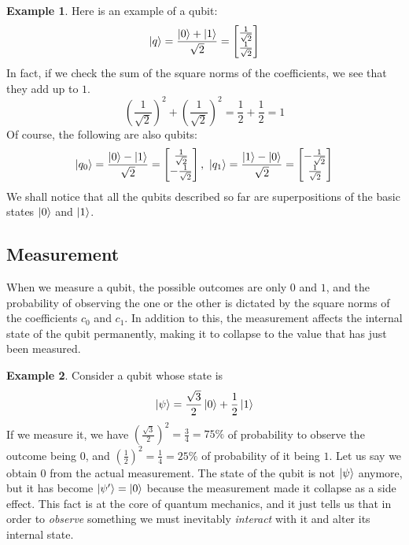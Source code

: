 \documentclass[12pt,a4paper]{report}
\theoremstyle{definition}
\theoremstyle{definition}
\newtheorem{example}{Example}[section]
\theoremstyle{definition}
\begin{document}
\begin{example}
Here is an example of a qubit:
\begin{equation*}
    \ket{q}=\frac{\ket{0}+\ket{1}}{\sqrt{2}}=\begin{bmatrix}
        \frac{1}{\sqrt{2}}\\
        \frac{1}{\sqrt{2}}
    \end{bmatrix}
\end{equation*}
In fact, if we check the sum of the square norms of the coefficients, we see that they add up to $1$.
\begin{equation*}
    \left(\frac{1}{\sqrt{2}}\right)^2+\left(\frac{1}{\sqrt{2}}\right)^2=\frac{1}{2}+\frac{1}{2}=1
\end{equation*}
Of course, the following are also qubits:
\begin{equation*}
    \ket{q_0}=\frac{\ket{0}-\ket{1}}{\sqrt{2}}=\begin{bmatrix}
        \frac{1}{\sqrt{2}}\\
        -\frac{1}{\sqrt{2}}
    \end{bmatrix},\ 
    \ket{q_1}=\frac{\ket{1}-\ket{0}}{\sqrt{2}}=\begin{bmatrix}
        -\frac{1}{\sqrt{2}}\\
        \frac{1}{\sqrt{2}}
    \end{bmatrix}
\end{equation*}
We shall notice that all the qubits described so far are superpositions of the basic states $\ket{0}$ and $\ket{1}$.
\end{example}



\subsection{Measurement}
When we measure a qubit, the possible outcomes are only $0$ and $1$, and the probability of observing the one or the other is dictated by the square norms of the coefficients $c_0$ and $c_1$. In addition to this, the measurement affects the internal state of the qubit permanently, making it to collapse to the value that has just been measured.
\begin{example}
Consider a qubit whose state is
\begin{equation*}
    \ket{\psi}=\frac{\sqrt{3}}{2}\ket{0}+\frac{1}{2}\ket{1}
\end{equation*}
If we measure it, we have $\left(\frac{\sqrt{3}}{2}\right)^2=\frac{3}{4}=75\%$ of probability to observe the outcome being $0$, and $\left(\frac{1}{2}\right)^2=\frac{1}{4}=25\%$ of probability of it being $1$. Let us say we obtain $0$ from the actual measurement. The state of the qubit is not $\ket{\psi}$ anymore, but it has become $\ket{\psi'}=\ket{0}$ because the measurement made it collapse as a side effect. This fact is at the core of quantum mechanics, and it just tells us that in order to \emph{observe} something we must inevitably \emph{interact} with it and alter its internal state.
\end{example}
\end{document}
